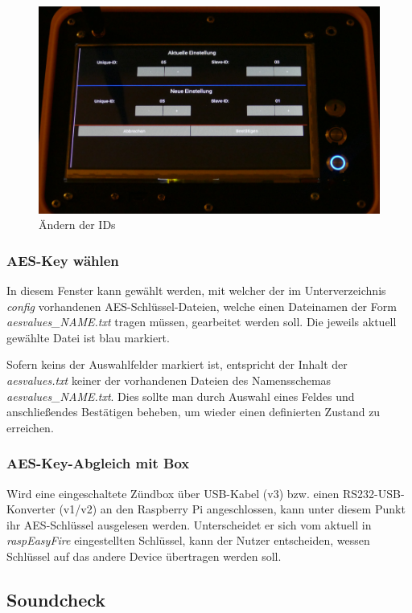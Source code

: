 \documentclass[paper=a4, parskip, numbers=noenddot, toc=listof, headsepline]{scrbook}
\newcommand{\REF}{\emph{raspEasyFire}}
\begin{document}
					\begin{figure}
						\centering\includegraphics[width=150mm]{Bilder/REFids}
						\caption{Ändern der IDs}
						\label{fig:REFids}
					\end{figure}

				\subsubsection{AES-Key wählen}
					In diesem Fenster kann gewählt werden, mit welcher der im Unterverzeichnis \emph{config} vorhandenen AES-Schlüssel-Dateien, welche einen Dateinamen der Form \emph{aesvalues\_NAME.txt} tragen müssen, gearbeitet werden soll. Die jeweils aktuell gewählte Datei ist blau markiert.

					Sofern keins der Auswahlfelder markiert ist, entspricht der Inhalt der \emph{aesvalues.txt} keiner der vorhandenen Dateien des Namensschemas \emph{aesvalues\_NAME.txt}. Dies sollte man durch Auswahl eines Feldes und anschließendes Bestätigen beheben, um wieder einen definierten Zustand zu erreichen.

				\subsubsection{AES-Key-Abgleich mit Box}
					Wird eine eingeschaltete Zündbox über USB-Kabel (v3) bzw. einen RS232-USB-Konverter (v1/v2) an den Raspberry Pi angeschlossen, kann unter diesem Punkt ihr AES-Schlüssel ausgelesen werden. Unterscheidet er sich vom aktuell in {\REF} eingestellten Schlüssel, kann der Nutzer entscheiden, wessen Schlüssel auf das andere Device übertragen werden soll.

			\subsection{Soundcheck}
\end{document}
